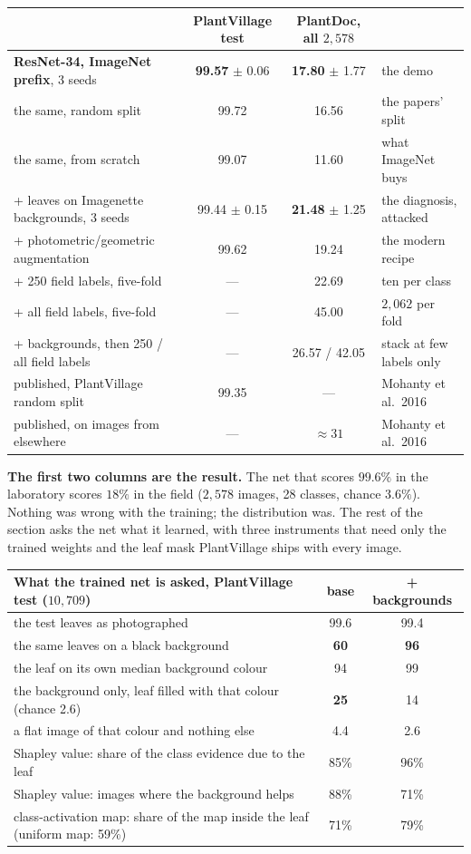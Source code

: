 \begin{center}
\small
\begin{tabular}{l c c p{3.9cm}}
\hline
& PlantVillage test & PlantDoc, all $2{,}578$ & \\
\hline
\textbf{ResNet-34, ImageNet prefix}, 3 seeds & \textbf{99.57} $\pm$ 0.06 & \textbf{17.80} $\pm$ 1.77 & the demo \\
\quad the same, random split & 99.72 & 16.56 & the papers' split \\
\quad the same, from scratch & 99.07 & 11.60 & what ImageNet buys \\
+ leaves on Imagenette backgrounds, 3 seeds & 99.44 $\pm$ 0.15 & \textbf{21.48} $\pm$ 1.25 & the diagnosis, attacked \\
+ photometric/geometric augmentation & 99.62 & 19.24 & the modern recipe \\
+ 250 field labels, five-fold & --- & 22.69 & ten per class \\
+ all field labels, five-fold & --- & 45.00 & $2{,}062$ per fold \\
+ backgrounds, then 250 / all field labels & --- & 26.57 / 42.05 & stack at few labels only \\
published, PlantVillage random split & 99.35 & --- & Mohanty et al.\ 2016 \\
published, on images from elsewhere & --- & $\approx 31$ & Mohanty et al.\ 2016 \\
\hline
\end{tabular}
\end{center}

\noindent \textbf{The first two columns are the result.} The net that
scores $99.6\%$ in the laboratory scores $18\%$ in the field ($2{,}578$
images, 28 classes, chance $3.6\%$). Nothing was wrong with the training;
the distribution was. The rest of the section asks the net what it learned,
with three instruments that need only the trained weights and the leaf mask
PlantVillage ships with every image.

\begin{center}
\small
\begin{tabular}{l c c}
\hline
What the trained net is asked, PlantVillage test ($10{,}709$) & base & + backgrounds \\
\hline
the test leaves as photographed & 99.6 & 99.4 \\
the same leaves on a black background & \textbf{60} & \textbf{96} \\
the leaf on its own median background colour & 94 & 99 \\
the background only, leaf filled with that colour (chance 2.6) & \textbf{25} & 14 \\
a flat image of that colour and nothing else & 4.4 & 2.6 \\
\hline
Shapley value: share of the class evidence due to the leaf & 85\% & 96\% \\
Shapley value: images where the background helps & 88\% & 71\% \\
class-activation map: share of the map inside the leaf (uniform map: 59\%) & 71\% & 79\% \\
\hline
\end{tabular}
\end{center}

